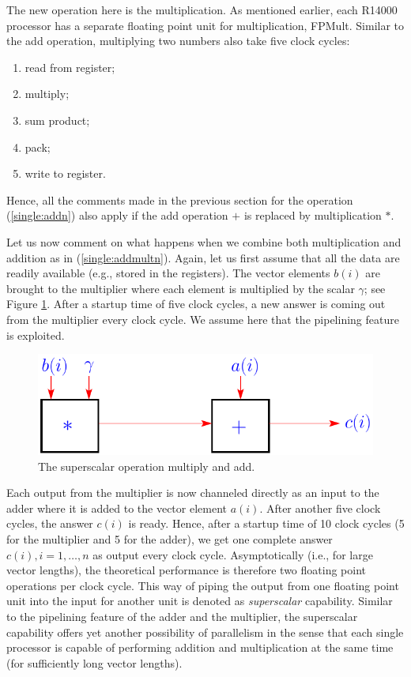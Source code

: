 \documentclass[11pt]{article}
\begin{document}
The new operation here is the multiplication. As mentioned earlier, 
each R14000 processor has 
a separate floating point unit for multiplication, FPMult. 
Similar to the add operation, multiplying two numbers also take five clock cycles: 
\begin{enumerate}
\item read from register; 
\item multiply;
\item sum product; 
\item pack;
\item write to register.
\end{enumerate}
Hence, all the comments made in the previous section 
for the operation (\ref{single:addn}) also apply if the add operation $+$ is 
replaced by multiplication $*$. 

Let us now comment on what happens when we combine both 
multiplication and addition as in (\ref{single:addmultn}). 
Again, let us first assume that all the data are readily available 
(e.g., stored in the registers). The vector elements 
$b(i)$ are brought to the multiplier where each element is multiplied 
by the scalar $\gamma$; see Figure \ref{fig:SuperScalar}. 
After a startup time of five clock cycles, a new answer is coming out 
from the multiplier every clock cycle. We assume here that the 
pipelining feature is exploited. 
\vspace{.5cm}

\begin{figure}[htbp]
  \begin{center}
    \includegraphics[scale=0.9]{SuperScalar}
  \end{center}
  \caption{The superscalar operation multiply and add. 
}
\label{fig:SuperScalar}
\end{figure}
\vspace{.5cm}

Each output from the multiplier is now channeled directly as an input 
to the adder where it is added to the vector element $a(i)$. 
After another five clock cycles, the answer $c(i)$ is ready. 
Hence, after a startup time of 10 clock cycles 
(5 for the multiplier and 5 for the adder), we get one complete 
answer $c(i), i=1,\ldots,n$ as output every clock cycle. 
Asymptotically (i.e., for large vector lengths), the theoretical performance 
is therefore two floating point operations per clock cycle. 
This way of piping the output from one floating point unit into 
the input for another unit is denoted as {\em superscalar} capability. 
Similar to the pipelining feature of the adder and the multiplier, 
the superscalar capability offers yet another possibility of parallelism
in the sense that each single processor is capable of performing 
addition and multiplication at the same time (for sufficiently long vector lengths). 
\end{document}
